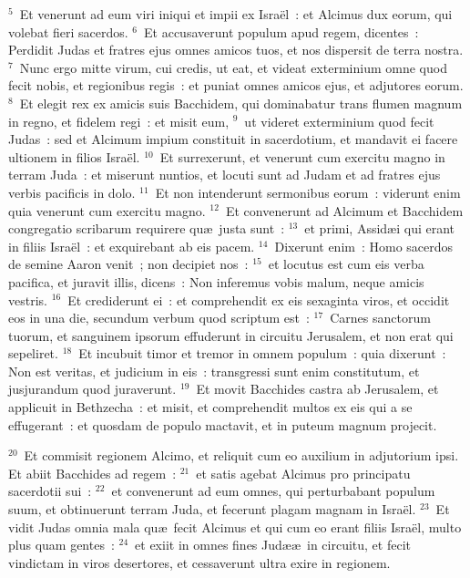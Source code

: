 ${}^{5}$~Et venerunt ad eum viri iniqui et impii ex Isra\"el~: et Alcimus dux eorum, qui volebat fieri sacerdos.
${}^{6}$~Et accusaverunt populum apud regem, dicentes~: Perdidit Judas et fratres ejus omnes amicos tuos, et nos dispersit de terra nostra.
${}^{7}$~Nunc ergo mitte virum, cui credis, ut eat, et videat exterminium omne quod fecit nobis, et regionibus regis~: et puniat omnes amicos ejus, et adjutores eorum.
${}^{8}$~Et elegit rex ex amicis suis Bacchidem, qui dominabatur trans flumen magnum in regno, et fidelem regi~: et misit eum,
${}^{9}$~ut videret exterminium quod fecit Judas~: sed et Alcimum impium constituit in sacerdotium, et mandavit ei facere ultionem in filios Isra\"el.
${}^{10}$~Et surrexerunt, et venerunt cum exercitu magno in terram Juda~: et miserunt nuntios, et locuti sunt ad Judam et ad fratres ejus verbis pacificis in dolo.
${}^{11}$~Et non intenderunt sermonibus eorum~: viderunt enim quia venerunt cum exercitu magno.
${}^{12}$~Et convenerunt ad Alcimum et Bacchidem congregatio scribarum requirere qu\ae\ justa sunt~:
${}^{13}$~et primi, Assid\ae i qui erant in filiis Isra\"el~: et exquirebant ab eis pacem.
${}^{14}$~Dixerunt enim~: Homo sacerdos de semine Aaron venit~; non decipiet nos~:
${}^{15}$~et locutus est cum eis verba pacifica, et juravit illis, dicens~: Non inferemus vobis malum, neque amicis vestris.
${}^{16}$~Et crediderunt ei~: et comprehendit ex eis sexaginta viros, et occidit eos in una die, secundum verbum quod scriptum est~:
${}^{17}$~Carnes sanctorum tuorum, et sanguinem ipsorum effuderunt in circuitu Jerusalem, et non erat qui sepeliret.
${}^{18}$~Et incubuit timor et tremor in omnem populum~: quia dixerunt~: Non est veritas, et judicium in eis~: transgressi sunt enim constitutum, et jusjurandum quod juraverunt.
${}^{19}$~Et movit Bacchides castra ab Jerusalem, et applicuit in Bethzecha~: et misit, et comprehendit multos ex eis qui a se effugerant~: et quosdam de populo mactavit, et in puteum magnum projecit.


${}^{20}$~Et commisit regionem Alcimo, et reliquit cum eo auxilium in adjutorium ipsi. Et abiit Bacchides ad regem~:
${}^{21}$~et satis agebat Alcimus pro principatu sacerdotii sui~:
${}^{22}$~et convenerunt ad eum omnes, qui perturbabant populum suum, et obtinuerunt terram Juda, et fecerunt plagam magnam in Isra\"el.
${}^{23}$~Et vidit Judas omnia mala qu\ae\ fecit Alcimus et qui cum eo erant filiis Isra\"el, multo plus quam gentes~:
${}^{24}$~et exiit in omnes fines Jud\ae \ae\ in circuitu, et fecit vindictam in viros desertores, et cessaverunt ultra exire in regionem.


